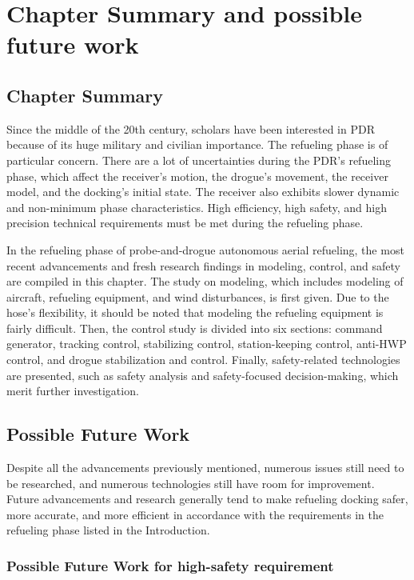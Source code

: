 \section{Chapter Summary and possible future work}

\subsection{Chapter Summary}

Since the middle of the 20th century, scholars have been interested
in PDR because of its huge military and civilian importance. The refueling
phase is of particular concern. There are a lot of uncertainties during
the PDR's refueling phase, which affect the receiver's motion, the
drogue's movement, the receiver model, and the docking's initial state.
The receiver also exhibits slower dynamic and non-minimum phase characteristics.
High efficiency, high safety, and high precision technical requirements
must be met during the refueling phase. 

In the refueling phase of probe-and-drogue autonomous aerial refueling,
the most recent advancements and fresh research findings in modeling,
control, and safety are compiled in this chapter. The study on modeling,
which includes modeling of aircraft, refueling equipment, and wind
disturbances, is first given. Due to the hose's flexibility, it should
be noted that modeling the refueling equipment is fairly difficult.
Then, the control study is divided into six sections: command generator,
tracking control, stabilizing control, station-keeping control, anti-HWP
control, and drogue stabilization and control. Finally, safety-related
technologies are presented, such as safety analysis and safety-focused
decision-making, which merit further investigation. 

\subsection{Possible Future Work }

Despite all the advancements previously mentioned, numerous issues
still need to be researched, and numerous technologies still have
room for improvement. Future advancements and research generally tend
to make refueling docking safer, more accurate, and more efficient
in accordance with the requirements in the refueling phase listed
in the Introduction.

\subsubsection{Possible Future Work for high-safety requirement}

